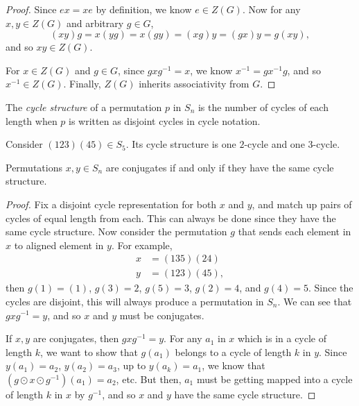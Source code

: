 \begin{proof}
    Since $ex = xe$ by definition, we know $e \in Z(G)$. Now for any $x, y \in Z(G)$ and arbitrary $g \in G$,
    \[(xy)g = x(yg) = x(gy) = (xg)y = (gx)y = g(xy),\] and so $xy \in Z(G)$.

    For $x \in Z(G)$ and $g \in G$, since $gxg^{-1} = x$, we know $x^{-1} = gx^{-1}g$, and so $x^{-1} \in Z(G)$. Finally, $Z(G)$ inherits associativity from $G$.
\end{proof}

\begin{defn}
    The \emph{cycle structure} of a permutation $p$ in $S_n$ is the number of cycles of each length when $p$ is written as disjoint cycles in cycle notation.
\end{defn}

\begin{exmp}
    Consider $(123)(45) \in S_5$. Its cycle structure is one $2$-cycle and one $3$-cycle.
\end{exmp}

\begin{thm}\label{cycle-structure-conjugates}
    Permutations $x, y \in S_n$ are conjugates if and only if they have the same cycle structure.
\end{thm}

\begin{proof}
    Fix a disjoint cycle representation for both $x$ and $y$, and match up pairs of cycles of equal length from each. This can always be done since they have the same cycle structure. Now consider the permutation $g$ that sends each element in $x$ to aligned element in $y$. For example,
    \begin{align*}
        x &= (135)(24) \\
        y &= (123)(45),
    \end{align*}
    then $g(1) = (1)$, $g(3) = 2$, $g(5) = 3$, $g(2) = 4$, and $g(4) = 5$. Since the cycles are disjoint, this will always produce a permutation in $S_n$. We can see that $gxg^{-1} = y$, and so $x$ and $y$ must be conjugates.

    If $x, y$ are conjugates, then $gxg^{-1} = y$. For any $a_1$ in $x$ which is in a cycle of length $k$, we want to show that $g(a_1)$ belongs to a cycle of length $k$ in $y$. Since $y(a_1) = a_2$, $y(a_2) = a_3$, up to $y(a_k) = a_1$, we know that $(g \odot x \odot g^{-1})(a_1) = a_2$, etc. But then, $a_1$ must be getting mapped into a cycle of length $k$ in $x$ by $g^{-1}$, and so $x$ and $y$ have the same cycle structure.
\end{proof}

